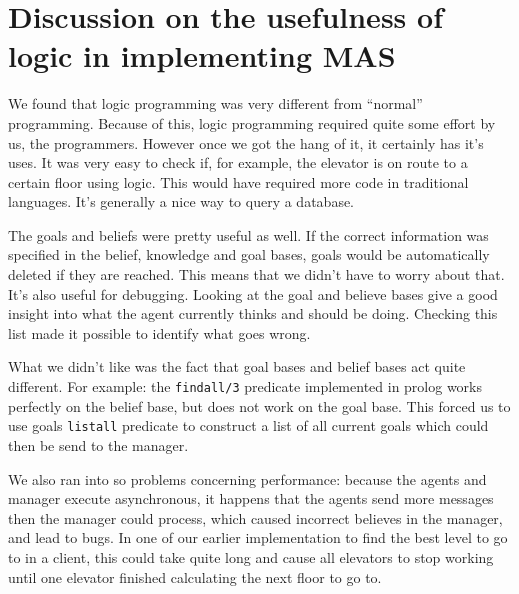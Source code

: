 \documentclass[a4paper,10pt,twocolumn]{article}
\begin{document}
\section{Discussion on the usefulness of logic in implementing MAS}
We found that logic programming was very different from ``normal'' programming. Because of this, logic programming required quite some effort by us, the programmers. However once we got the hang of it, it certainly has it's uses. It was very easy to check if, for example, the elevator is on route to a certain floor using logic. This would have required more code in traditional languages. It's generally a nice way to query a database.

The goals and beliefs were pretty useful as well. If the correct information was specified in the belief, knowledge and goal bases, goals would be automatically deleted if they are reached. This means that we didn't have to worry about that. It's also useful for debugging. Looking at the goal and believe bases give a good insight into what the agent currently thinks and should be doing. Checking this list made it possible to identify what goes wrong.  

What we didn't like was the fact that goal bases and belief bases act quite different. For example: the \texttt{findall/3} predicate implemented in prolog works perfectly on the belief base, but does not work on the goal base. This forced us to use goals \texttt{listall} predicate to construct a list of all current goals which could then be send to the manager. 

We also ran into so problems concerning performance: because the agents and manager execute asynchronous, it happens that the agents send more messages then the manager could process, which caused incorrect believes in the manager, and lead to bugs. In one of our earlier implementation to find the best level to go to in a client, this could take quite long and cause all elevators to stop working until one elevator finished calculating the next floor to go to.
\end{document}
